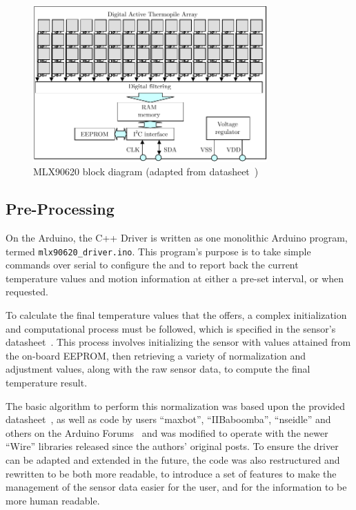 \documentclass[../thesis/thesis.tex]{subfiles}
\begin{document}
\begin{figure}
\centering
\includegraphics[width=0.8\textwidth]{../diagrams/mlx-block-diagram.pdf}
\caption{MLX90620 block diagram (adapted from datasheet~\cite{MLXDatasheet})}
\label{fig:exps:blockdia}
\end{figure}

\subsection{Pre-Processing}

On the Arduino, the \tarl C++ Driver is written as one monolithic Arduino program, termed \texttt{mlx90620\_driver.ino}. This program's purpose is to take simple commands over serial to configure the \mlx and to report back the current temperature values and \pir motion information at either a pre-set interval, or when requested.

To calculate the final temperature values that the \mlx offers, a complex initialization and computational process must be followed, which is specified in the sensor's datasheet~\cite{MLXDatasheet}. This process involves initializing the sensor with values attained from the on-board EEPROM, then retrieving a variety of normalization and adjustment values, along with the raw sensor data, to compute the final temperature result.

The basic algorithm to perform this normalization was based upon the provided datasheet~\cite{MLXDatasheet}, as well as code by users ``maxbot'', ``IIBaboomba'', ``nseidle'' and others on the Arduino Forums~\cite{ArduinoForum} and was modified to operate with the newer \ard ``Wire'' \iic libraries released since the authors' original posts. To ensure the driver can be adapted and extended in the future, the code was also restructured and rewritten to be both more readable, to introduce a set of features to make the management of the sensor data easier for the user, and for the information to be more human readable.
\end{document}
